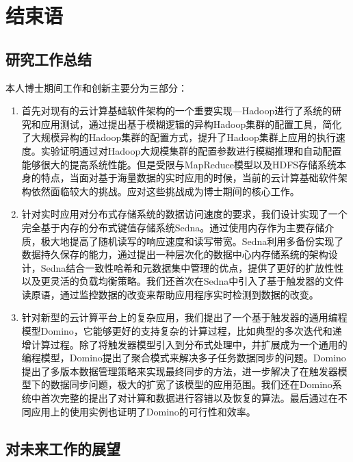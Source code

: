 \chapter{结束语}

\section{研究工作总结}

本人博士期间工作和创新主要分为三部分：
\begin{enumerate}

\item 首先对现有的云计算基础软件架构的一个重要实现—Hadoop进行了系统的研究和应用测试，通过提出基于模糊逻辑的异构Hadoop集群的配置工具，简化了大规模异构的Hadoop集群的配置方式，提升了Hadoop集群上应用的执行速度。实验证明通过对Hadoop大规模集群的配置参数进行模糊推理和自动配置能够很大的提高系统性能。但是受限与MapReduce模型以及HDFS存储系统本身的特点，当面对基于海量数据的实时应用的时候，当前的云计算基础软件架构依然面临较大的挑战。应对这些挑战成为博士期间的核心工作。

\item 针对实时应用对分布式存储系统的数据访问速度的要求，我们设计实现了一个完全基于内存的分布式键值存储系统Sedna。通过使用内存作为主要存储介质，极大地提高了随机读写的响应速度和读写带宽。Sedna利用多备份实现了数据持久保存的能力，通过提出一种层次化的数据中心内存储系统的架构设计，Sedna结合一致性哈希和元数据集中管理的优点，提供了更好的扩放性性以及更灵活的负载均衡策略。我们还首次在Sedna中引入了基于触发器的文件读原语，通过监控数据的改变来帮助应用程序实时检测到数据的改变。

\item 针对新型的云计算平台上的复杂应用，我们提出了一个基于触发器的通用编程模型Domino，它能够更好的支持复杂的计算过程，比如典型的多次迭代和递增计算过程。除了将触发器模型引入到分布式处理中，并扩展成为一个通用的编程模型，Domino提出了聚合模式来解决多子任务数据同步的问题。Domino提出了多版本数据管理策略来实现最终同步的方法，进一步解决了在触发器模型下的数据同步问题，极大的扩宽了该模型的应用范围。我们还在Domino系统中首次完整的提出了对计算和数据进行容错以及恢复的算法。最后通过在不同应用上的使用实例也证明了Domino的可行性和效率。

\end{enumerate}


\section{对未来工作的展望}

